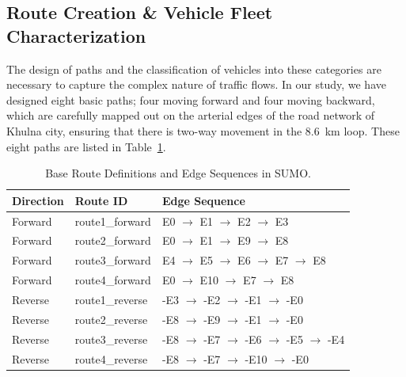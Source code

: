 \documentclass{thesis-library}
\begin{document}
\subsection{Route Creation \& Vehicle Fleet Characterization}

The design of paths and the classification of vehicles into these categories are necessary to capture the complex nature of traffic flows. In our study, we have designed eight basic paths; four moving forward and four moving backward, which are carefully mapped out on the arterial edges of the road network of Khulna city, ensuring that there is two-way movement in the 8.6~km loop. These eight paths are listed in Table~\ref{tab:route_definitions}.

\begin{table}[H]
\caption{Base Route Definitions and Edge Sequences in SUMO.}
\label{tab:route_definitions}
\begin{center}
\begin{small}
\begin{tabular}{|l|l|l|}
\hline
\textbf{Direction} & \textbf{Route ID} & \textbf{Edge Sequence} \\ \hline
Forward & route1\_forward & E0 $\rightarrow$ E1 $\rightarrow$ E2 $\rightarrow$ E3 \\
Forward & route2\_forward & E0 $\rightarrow$ E1 $\rightarrow$ E9 $\rightarrow$ E8 \\
Forward & route3\_forward & E4 $\rightarrow$ E5 $\rightarrow$ E6 $\rightarrow$ E7 $\rightarrow$ E8 \\
Forward & route4\_forward & E0 $\rightarrow$ E10 $\rightarrow$ E7 $\rightarrow$ E8 \\ \hline
Reverse & route1\_reverse & -E3 $\rightarrow$ -E2 $\rightarrow$ -E1 $\rightarrow$ -E0 \\
Reverse & route2\_reverse & -E8 $\rightarrow$ -E9 $\rightarrow$ -E1 $\rightarrow$ -E0 \\
Reverse & route3\_reverse & -E8 $\rightarrow$ -E7 $\rightarrow$ -E6 $\rightarrow$ -E5 $\rightarrow$ -E4 \\
Reverse & route4\_reverse & -E8 $\rightarrow$ -E7 $\rightarrow$ -E10 $\rightarrow$ -E0 \\ \hline
\end{tabular}
\end{small}
\end{center}
\end{table}
\end{document}
